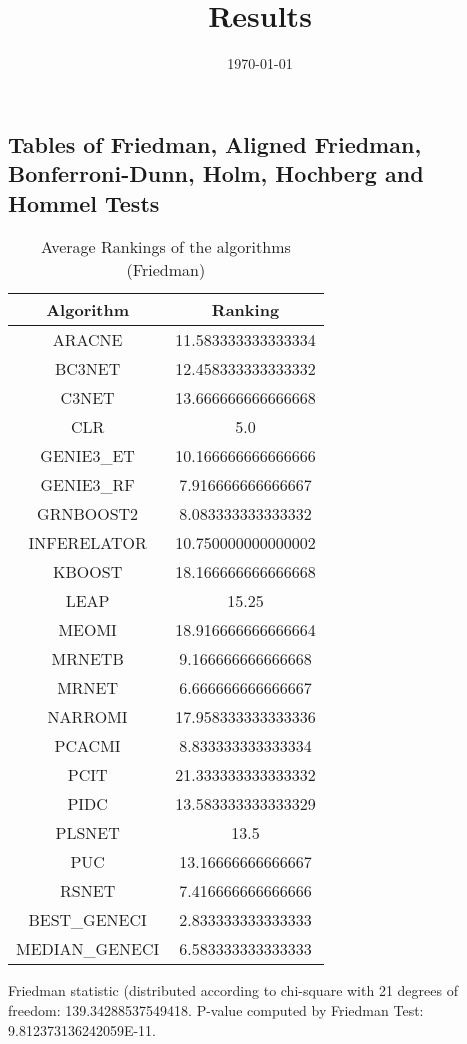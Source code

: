 \documentclass[a4paper,10pt]{article}
\title{Results}
\author{}
\date{\today}
\begin{document}
\begin{landscape}
\oddsidemargin 0in \topmargin 0in\maketitle
\section{Tables of Friedman, Aligned Friedman, Bonferroni-Dunn, Holm, Hochberg and Hommel Tests}
\begin{table}[!htp]
\centering
\caption{Average Rankings of the algorithms (Friedman)
}\begin{tabular}{c|c}
Algorithm&Ranking\\
\hline
ARACNE&11.583333333333334\\
BC3NET&12.458333333333332\\
C3NET&13.666666666666668\\
CLR&5.0\\
GENIE3_ET&10.166666666666666\\
GENIE3_RF&7.916666666666667\\
GRNBOOST2&8.083333333333332\\
INFERELATOR&10.750000000000002\\
KBOOST&18.166666666666668\\
LEAP&15.25\\
MEOMI&18.916666666666664\\
MRNETB&9.166666666666668\\
MRNET&6.666666666666667\\
NARROMI&17.958333333333336\\
PCACMI&8.833333333333334\\
PCIT&21.333333333333332\\
PIDC&13.583333333333329\\
PLSNET&13.5\\
PUC&13.16666666666667\\
RSNET&7.416666666666666\\
BEST_GENECI&2.833333333333333\\
MEDIAN_GENECI&6.583333333333333\\
\end{tabular}
\end{table}


Friedman statistic (distributed according to chi-square with 21 degrees of freedom: 139.34288537549418. 
P-value computed by Friedman Test: 9.812373136242059E-11.\newline


\end{landscape}
\end{document}
